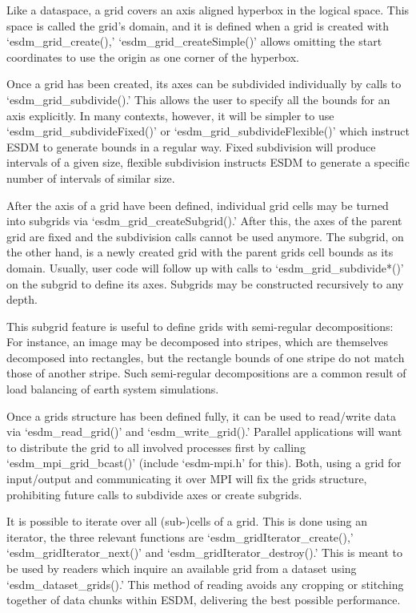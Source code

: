Like a dataspace, a grid covers an axis aligned hyperbox in the logical
space. This space is called the grid's domain, and it is defined when a
grid is created with `esdm\_grid\_create(),'
`esdm\_grid\_createSimple()' allows omitting the start coordinates to
use the origin as one corner of the hyperbox.

Once a grid has been created, its axes can be subdivided individually by
calls to `esdm\_grid\_subdivide().' This allows the user to specify all
the bounds for an axis explicitly. In many contexts, however, it will be
simpler to use `esdm\_grid\_subdivideFixed()' or
`esdm\_grid\_subdivideFlexible()' which instruct ESDM to generate bounds
in a regular way. Fixed subdivision will produce intervals of a given
size, flexible subdivision instructs ESDM to generate a specific number
of intervals of similar size.

After the axis of a grid have been defined, individual grid cells may be
turned into subgrids via `esdm\_grid\_createSubgrid().' After this, the
axes of the parent grid are fixed and the subdivision calls cannot be
used anymore. The subgrid, on the other hand, is a newly created grid
with the parent grids cell bounds as its domain. Usually, user code will
follow up with calls to `esdm\_grid\_subdivide*()' on the subgrid to
define its axes. Subgrids may be constructed recursively to any depth.

This subgrid feature is useful to define grids with semi-regular
decompositions: For instance, an image may be decomposed into stripes,
which are themselves decomposed into rectangles, but the rectangle
bounds of one stripe do not match those of another stripe. Such
semi-regular decompositions are a common result of load balancing of
earth system simulations.

Once a grids structure has been defined fully, it can be used to
read/write data via `esdm\_read\_grid()' and `esdm\_write\_grid().'
Parallel applications will want to distribute the grid to all involved
processes first by calling `esdm\_mpi\_grid\_bcast()' (include
`esdm-mpi.h' for this). Both, using a grid for input/output and
communicating it over MPI will fix the grids structure, prohibiting
future calls to subdivide axes or create subgrids.

It is possible to iterate over all (sub-)cells of a grid. This is done
using an iterator, the three relevant functions are
`esdm\_gridIterator\_create(),' `esdm\_gridIterator\_next()' and
`esdm\_gridIterator\_destroy().' This is meant to be used by readers
which inquire an available grid from a dataset using
`esdm\_dataset\_grids().' This method of reading avoids any cropping or
stitching together of data chunks within ESDM, delivering the best
possible performance.

